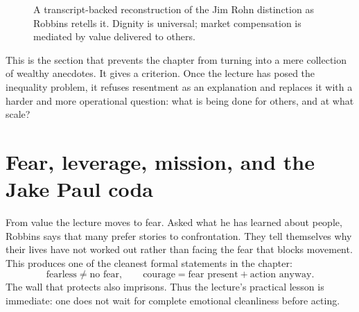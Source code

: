 \begin{figure}[h]
\centering
{}
\caption{A transcript-backed reconstruction of the Jim Rohn distinction as Robbins retells it. Dignity is universal; market compensation is mediated by value delivered to others.}
\end{figure}

This is the section that prevents the chapter from turning into a mere collection of wealthy anecdotes. It gives a criterion. Once the lecture has posed the inequality problem, it refuses resentment as an explanation and replaces it with a harder and more operational question: what is being done for others, and at what scale?

\section{Fear, leverage, mission, and the Jake Paul coda}

From value the lecture moves to fear. Asked what he has learned about people, Robbins says that many prefer stories to confrontation. They tell themselves why their lives have not worked out rather than facing the fear that blocks movement. This produces one of the cleanest formal statements in the chapter:
\begin{equation}
\text{fearless} \neq \text{no fear}, \qquad
\text{courage} = \text{fear present} + \text{action anyway}.
\end{equation}
The wall that protects also imprisons. Thus the lecture's practical lesson is immediate: one does not wait for complete emotional cleanliness before acting.

